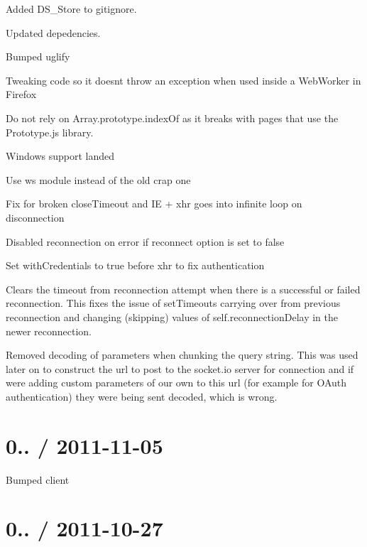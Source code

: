\begin{DoxyItemize}
\item Added D\+S\+\_\+\+Store to gitignore.
\item Updated depedencies.
\item Bumped uglify
\item Tweaking code so it doesn\textquotesingle{}t throw an exception when used inside a Web\+Worker in Firefox
\item Do not rely on Array.\+prototype.\+index\+Of as it breaks with pages that use the Prototype.\+js library.
\item Windows support landed
\item Use  ws module instead of the old crap one
\item Fix for broken close\+Timeout and \textquotesingle{}IE + xhr\textquotesingle{} goes into infinite loop on disconnection
\item Disabled reconnection on error if reconnect option is set to false
\item Set with\+Credentials to true before xhr to fix authentication
\item Clears the timeout from reconnection attempt when there is a successful or failed reconnection. This fixes the issue of set\+Timeout\textquotesingle{}s carrying over from previous reconnection and changing (skipping) values of self.\+reconnection\+Delay in the newer reconnection.
\item Removed decoding of parameters when chunking the query string. This was used later on to construct the url to post to the socket.\+io server for connection and if we\textquotesingle{}re adding custom parameters of our own to this url (for example for O\+Auth authentication) they were being sent decoded, which is wrong.
\end{DoxyItemize}

\section*{0.. / 2011-\/11-\/05 }


\begin{DoxyItemize}
\item Bumped client
\end{DoxyItemize}

\section*{0.. / 2011-\/10-\/27 }


